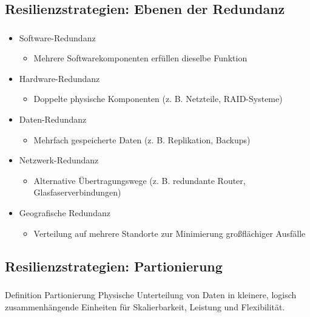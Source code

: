 \subsection{Resilienzstrategien: Ebenen der Redundanz}
\begin{frame}
    \frametitle{\insertsection}
    \framesubtitle{\insertsubsection}

        \begin{itemize}
            \item Software-Redundanz
            \begin{itemize}
                \item Mehrere Softwarekomponenten erfüllen dieselbe Funktion
            \end{itemize}
            \item Hardware-Redundanz
            \begin{itemize}
                \item Doppelte physische Komponenten (z. B. Netzteile, RAID-Systeme)
            \end{itemize}
            \item Daten-Redundanz
            \begin{itemize}
                \item Mehrfach gespeicherte Daten (z. B. Replikation, Backups)
            \end{itemize}
            \item Netzwerk-Redundanz
            \begin{itemize}
                \item Alternative Übertragungswege (z. B. redundante Router, Glasfaserverbindungen)
            \end{itemize}
            \item Geografische Redundanz
            \begin{itemize}
                \item Verteilung auf mehrere Standorte zur Minimierung großflächiger Ausfälle
            \end{itemize}
        \end{itemize}
\end{frame}

\subsection{Resilienzstrategien: Partionierung}
\begin{frame}
    \frametitle{\insertsection}
    \framesubtitle{\insertsubsection}

    \begin{block}{Definition Partionierung}
        Physische Unterteilung von Daten in kleinere, logisch zusammenhängende Einheiten für Skalierbarkeit, Leistung und Flexibilität.
    \end{block}
\end{frame}



